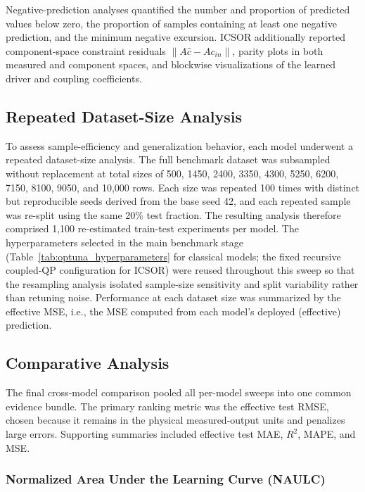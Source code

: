 \documentclass[11pt]{article}
\begin{document}
Negative-prediction analyses quantified the number and proportion of predicted values below zero, the proportion of samples containing at least one negative prediction, and the minimum negative excursion. ICSOR additionally reported component-space constraint residuals $\|A\hat{c} - Ac_{in}\|$, parity plots in both measured and component spaces, and blockwise visualizations of the learned driver and coupling coefficients.

\subsection{Repeated Dataset-Size Analysis}

To assess sample-efficiency and generalization behavior, each model underwent a repeated dataset-size analysis. The full benchmark dataset was subsampled without replacement at total sizes of 500, 1450, 2400, 3350, 4300, 5250, 6200, 7150, 8100, 9050, and 10,000 rows. Each size was repeated 100 times with distinct but reproducible seeds derived from the base seed 42, and each repeated sample was re-split using the same 20\% test fraction. The resulting analysis therefore comprised 1,100 re-estimated train-test experiments per model. The hyperparameters selected in the main benchmark stage (Table~\ref{tab:optuna_hyperparameters} for classical models; the fixed recursive coupled-QP configuration for ICSOR) were reused throughout this sweep so that the resampling analysis isolated sample-size sensitivity and split variability rather than retuning noise. Performance at each dataset size was summarized by the effective MSE, i.e., the MSE computed from each model's deployed (effective) prediction.

\subsection{Comparative Analysis}

The final cross-model comparison pooled all per-model sweeps into one common evidence bundle. The primary ranking metric was the effective test RMSE, chosen because it remains in the physical measured-output units and penalizes large errors. Supporting summaries included effective test MAE, $R^2$, MAPE, and MSE.

\subsubsection{Normalized Area Under the Learning Curve (NAULC)}
\end{document}
